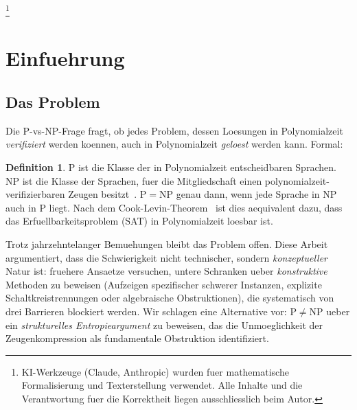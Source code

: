 \documentclass[aps,prd,twocolumn,superscriptaddress,nofootinbib]{revtex4-2}
\theoremstyle{definition}
\newtheorem{definition}[theorem]{Definition}
\theoremstyle{remark}
\newcommand{\NP}{\mathrm{NP}}
\newcommand{\PP}{\mathrm{P}}
\begin{document}

\thanks{KI-Werkzeuge (Claude, Anthropic) wurden fuer mathematische Formalisierung und Texterstellung verwendet. Alle Inhalte und die Verantwortung fuer die Korrektheit liegen ausschliesslich beim Autor.}

\maketitle


\section{Einfuehrung}
\label{sec:intro}

\subsection{Das Problem}

Die $\PP$-vs-$\NP$-Frage fragt, ob jedes Problem, dessen Loesungen in Polynomialzeit \textit{verifiziert} werden koennen, auch in Polynomialzeit \textit{geloest} werden kann. Formal:

\begin{definition}
$\PP$ ist die Klasse der in Polynomialzeit entscheidbaren Sprachen. $\NP$ ist die Klasse der Sprachen, fuer die Mitgliedschaft einen polynomialzeit-verifizierbaren Zeugen besitzt~\cite{Arora2009}. $\PP = \NP$ genau dann, wenn jede Sprache in $\NP$ auch in $\PP$ liegt. Nach dem Cook-Levin-Theorem~\cite{Cook1971} ist dies aequivalent dazu, dass das Erfuellbarkeitsproblem (SAT) in Polynomialzeit loesbar ist.
\end{definition}

Trotz jahrzehntelanger Bemuehungen bleibt das Problem offen. Diese Arbeit argumentiert, dass die Schwierigkeit nicht technischer, sondern \textit{konzeptueller} Natur ist: fruehere Ansaetze versuchen, untere Schranken ueber \textit{konstruktive} Methoden zu beweisen (Aufzeigen spezifischer schwerer Instanzen, explizite Schaltkreistrennungen oder algebraische Obstruktionen), die systematisch von drei Barrieren blockiert werden. Wir schlagen eine Alternative vor: $\PP \neq \NP$ ueber ein \textit{strukturelles Entropieargument} zu beweisen, das die Unmoeglichkeit der Zeugenkompression als fundamentale Obstruktion identifiziert.
\end{document}
